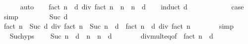 \begin{isabellebody}
\ \ \ \ \isamarkupfalse%
\ auto\isanewline
\ \ \isamarkupfalse%
\ {\isachardoublequoteopen}fact\ {\isacharparenleft}{\kern0pt}n\ {\isacharplus}{\kern0pt}\ d{\isacharparenright}{\kern0pt}\ div\ {\isacharparenleft}{\kern0pt}fact\ n{\isacharparenright}{\kern0pt}\ {\isacharequal}{\kern0pt}\ {\isasymProd}{\isacharbraceleft}{\kern0pt}n\ {\isacharplus}{\kern0pt}\ {}{\isachardot}{\kern0pt}{\isachardot}{\kern0pt}n\ {\isacharplus}{\kern0pt}\ d{\isacharbraceright}{\kern0pt}{\isachardoublequoteclose}\isanewline
\ \ \isamarkupfalse%
\ {\isacharparenleft}{\kern0pt}induct\ d{\isacharparenright}{\kern0pt}\isanewline
\ \ \ \ \isamarkupfalse%
\ {}\isanewline
\ \ \ \ \isamarkupfalse%
\ {\isacharquery}{\kern0pt}case\ \isamarkupfalse%
\ simp\isanewline
\ \ \isamarkupfalse%
\isanewline
\ \ \ \ \isamarkupfalse%
\ {\isacharparenleft}{\kern0pt}Suc\ d{\isacharprime}{\kern0pt}{\isacharparenright}{\kern0pt}\isanewline
\ \ \ \ \isamarkupfalse%
\ {\isachardoublequoteopen}fact\ {\isacharparenleft}{\kern0pt}n\ {\isacharplus}{\kern0pt}\ Suc\ d{\isacharprime}{\kern0pt}{\isacharparenright}{\kern0pt}\ div\ fact\ n\ {\isacharequal}{\kern0pt}\ Suc\ {\isacharparenleft}{\kern0pt}n\ {\isacharplus}{\kern0pt}\ d{\isacharprime}{\kern0pt}{\isacharparenright}{\kern0pt}\ {\isacharasterisk}{\kern0pt}\ fact\ {\isacharparenleft}{\kern0pt}n\ {\isacharplus}{\kern0pt}\ d{\isacharprime}{\kern0pt}{\isacharparenright}{\kern0pt}\ div\ fact\ n{\isachardoublequoteclose}\isanewline
\ \ \ \ \ \ \isamarkupfalse%
\ simp\isanewline
\ \ \ \ \isamarkupfalse%
\ \isamarkupfalse%
\ Suc{\isachardot}{\kern0pt}hyps\ \isamarkupfalse%
\ {\isachardoublequoteopen}{\isasymdots}\ {\isacharequal}{\kern0pt}\ Suc\ {\isacharparenleft}{\kern0pt}n\ {\isacharplus}{\kern0pt}\ d{\isacharprime}{\kern0pt}{\isacharparenright}{\kern0pt}\ {\isacharasterisk}{\kern0pt}\ {\isasymProd}{\isacharbraceleft}{\kern0pt}n\ {\isacharplus}{\kern0pt}\ {}{\isachardot}{\kern0pt}{\isachardot}{\kern0pt}n\ {\isacharplus}{\kern0pt}\ d{\isacharprime}{\kern0pt}{\isacharbraceright}{\kern0pt}{\isachardoublequoteclose}\isanewline
\ \ \ \ \ \ \isamarkupfalse%
\ div{\isacharunderscore}{\kern0pt}mult{}{\isacharunderscore}{\kern0pt}eq{\isacharbrackleft}{\kern0pt}of\ {\isacharunderscore}{\kern0pt}\ {\isachardoublequoteopen}fact\ {\isacharparenleft}{\kern0pt}n\ {\isacharplus}{\kern0pt}\ d{\isacharprime}{\kern0pt}{\isacharparenright}{\kern0pt}{\isachardoublequoteclose}{\isacharbrackright}{\kern0pt}\ \isamarkupfalse%

\end{isabellebody}
